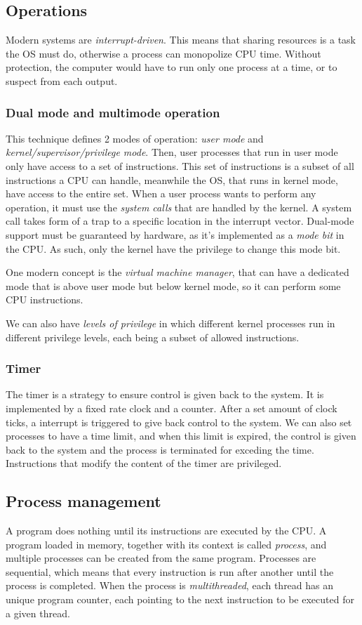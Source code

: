 \documentclass{article}
\begin{document}
\subsection{Operations}
Modern systems are \emph{interrupt-driven}. This means that sharing resources is a task the OS must do, otherwise a process can monopolize CPU time. Without protection, the computer would have to run only one process at a time, or to suspect from each output.

\subsubsection{Dual mode and multimode operation}
This technique defines 2 modes of operation: \emph{user mode} and \emph{kernel/supervisor/privilege mode}. Then, user processes that run in user mode only have access to a set of instructions. This set of instructions is a subset of all instructions a CPU can handle, meanwhile the OS, that runs in kernel mode, have access to the entire set. When a user process wants to perform any operation, it must use the \emph{system calls} that are handled by the kernel. A system call takes form of a trap to a specific location in the interrupt vector. Dual-mode support must be guaranteed by hardware, as it's implemented as a \emph{mode bit} in the CPU. As such, only the kernel have the privilege to change this mode bit.

One modern concept is the \emph{virtual machine manager}, that can have a dedicated mode that is above user mode but below kernel mode, so it can perform some CPU instructions.

We can also have \emph{levels of privilege} in which different kernel processes run in different privilege levels, each being a subset of allowed instructions.

\subsubsection{Timer}
The timer is a strategy to ensure control is given back to the system. It is implemented by a fixed rate clock and a counter. After a set amount of clock ticks, a interrupt is triggered to give back control to the system. We can also set processes to have a time limit, and when this limit is expired, the control is given back to the system and the process is terminated for exceding the time. Instructions that modify the content of the timer are privileged.

\subsection{Process management}
A program does nothing until its instructions are executed by the CPU. A program loaded in memory, together with its context is called \emph{process}, and multiple processes can be created from the same program. Processes are sequential, which means that every instruction is run after another until the process is completed. When the process is \emph{multithreaded}, each thread has an unique program counter, each pointing to the next instruction to be executed for a given thread.
\end{document}
